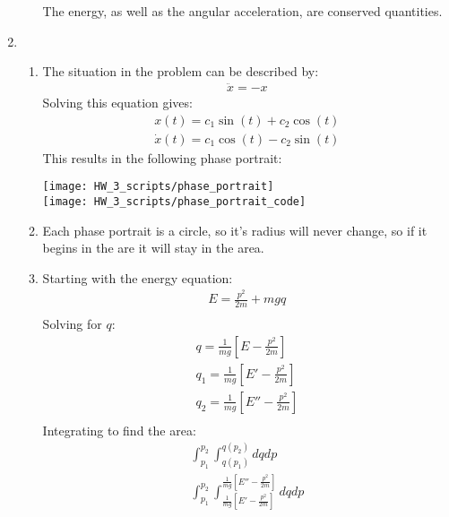 \documentclass[12pt]{article}
\begin{document}
\begin{enumerate}
\begin{enumerate}
            The energy, as well as the angular acceleration, are conserved quantities.
        \end{enumerate}
        \item
        \begin{enumerate}
            \item
            The situation in the problem can be described by:
            \begin{gather*}
                \ddot{x}=-x
            \end{gather*}
            Solving this equation gives:
            \begin{gather*}
                x(t)=c_1\sin(t)+c_2\cos(t)\\
                \dot{x}(t)=c_1\cos(t)-c_2\sin(t)
            \end{gather*}
            This results in the following phase portrait:\\
            \linebreak
            \begin{center}
                \texttt{[image: HW\_3\_scripts/phase\_portrait]}\\
                \texttt{[image: HW\_3\_scripts/phase\_portrait\_code]}
            \end{center}
            \item Each phase portrait is a circle, so it's radius will never change, so if it begins in the are it will stay in the area.
            \item
            Starting with the energy equation:
            \begin{gather*}
                E=\frac{p^2}{2m}+mgq\\
            \end{gather*}
            Solving for $q$:
            \begin{gather*}
                q=\frac{1}{mg}\left[E-\frac{p^2}{2m}\right]\\
                q_1=\frac{1}{mg}\left[E'-\frac{p^2}{2m}\right]\\
                q_2=\frac{1}{mg}\left[E''-\frac{p^2}{2m}\right]\\
            \end{gather*}
            Integrating to find the area:
            \begin{gather*}
                \int_{p_1}^{p_2}\int_{q(p_1)}^{q(p_2)}dqdp\\
                \int_{p_1}^{p_2}\int_{\frac{1}{mg}\left[E'-\frac{p^2}{2m}\right]}^{\frac{1}{mg}\left[E''-\frac{p^2}{2m}\right]}dqdp\\

\end{gather*}
\end{enumerate}
\end{enumerate}
\end{document}
